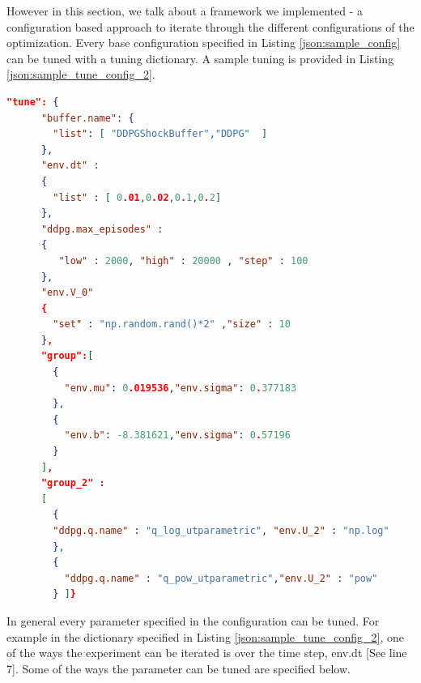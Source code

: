 However in this section, we talk about a framework we implemented -  a configuration based approach to iterate through the different configurations of the optimization. Every base configuration specified in Listing \ref{json:sample_config} can be tuned with a tuning dictionary. A sample tuning is provided in Listing \ref{json:sample_tune_config_2}. \pagebreak
\begin{lstlisting}[language=json,firstnumber=1,caption=Tuning dictionary,label=json:sample_tune_config_2]
    "tune": {
      "buffer.name": {
        "list": [ "DDPGShockBuffer","DDPG"  ]
      },
      "env.dt" :
      {
        "list" : [ 0.01,0.02,0.1,0.2]        
      },
      "ddpg.max_episodes" :
      {
         "low" : 2000, "high" : 20000 , "step" : 100
      },
      "env.V_0"
      {
        "set" : "np.random.rand()*2" ,"size" : 10
      },
      "group":[
        {
          "env.mu": 0.019536,"env.sigma": 0.377183
        },
        {
          "env.b": -8.381621,"env.sigma": 0.57196
        }
      ],
      "group_2" :
      [
        {
        "ddpg.q.name" : "q_log_utparametric", "env.U_2" : "np.log"
        },
        {
          "ddpg.q.name" : "q_pow_utparametric","env.U_2" : "pow"
        } ]}

\end{lstlisting}
 In general every parameter specified in the configuration can be tuned. For example in the dictionary specified in 
 Listing \ref{json:sample_tune_config_2}, one of the ways the experiment can be iterated is over the time step, env.dt [See line 7]. Some of the ways the parameter can be tuned are specified below.

